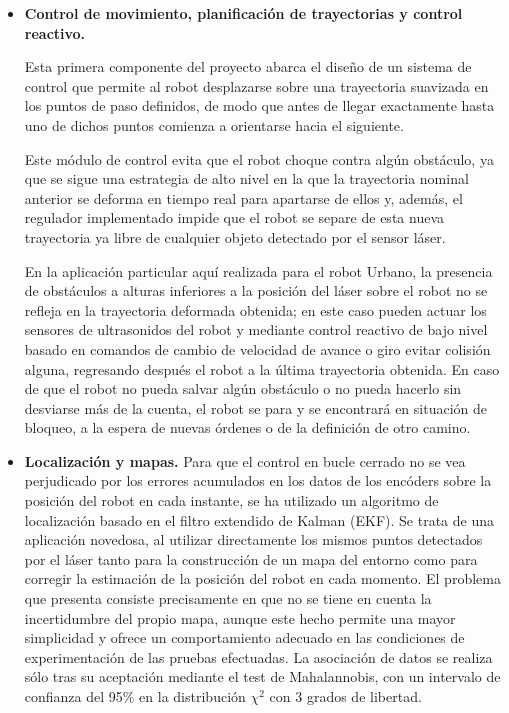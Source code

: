 \begin{itemize}
  \item \textbf{Control de movimiento, planificación de trayectorias y control reactivo.}

  Esta primera componente del proyecto abarca el diseño de un sistema de control que permite al robot desplazarse sobre una trayectoria suavizada en los puntos de paso definidos, de modo que antes de llegar exactamente hasta uno de dichos puntos comienza a orientarse hacia el siguiente.

  Este módulo de control evita que el robot choque contra algún obstáculo, ya que se sigue una estrategia de alto nivel en la que la trayectoria nominal anterior se deforma en tiempo real para apartarse de ellos y, además, el regulador implementado impide que el robot se separe de esta nueva trayectoria ya libre de cualquier objeto detectado por el sensor láser.

  En la aplicación particular aquí realizada para el robot Urbano, la presencia de obstáculos a alturas inferiores a la posición del láser sobre el robot no se refleja en la trayectoria deformada obtenida; en este caso pueden actuar los sensores de ultrasonidos del robot y mediante control reactivo de bajo nivel basado en comandos de cambio de velocidad de avance o giro evitar colisión alguna, regresando después el robot a la última trayectoria obtenida. En caso de que el robot no pueda salvar algún obstáculo o no pueda hacerlo sin desviarse más de la cuenta, el robot se para y se encontrará en situación de bloqueo, a la espera de nuevas órdenes o de la definición de otro camino.

  \item \textbf{Localización y mapas.}
  Para que el control en bucle cerrado no se vea perjudicado por los errores acumulados en los datos de los encóders sobre la posición del robot en cada instante, se ha utilizado un algoritmo de localización basado en el filtro extendido de Kalman (EKF). Se trata de una aplicación novedosa, al utilizar directamente los mismos puntos detectados por el láser tanto para la construcción de un mapa del entorno como para corregir la estimación de la posición del robot en cada momento. El problema que presenta consiste precisamente en que no se tiene en cuenta la incertidumbre del propio mapa, aunque este hecho permite una mayor simplicidad y ofrece un comportamiento adecuado en las condiciones de experimentación de las pruebas efectuadas. La asociación de datos se realiza sólo tras su aceptación mediante el test de Mahalannobis, con un intervalo de confianza del 95\% en la distribución $\chi^{2}$ con 3 grados de libertad.


\end{itemize}
